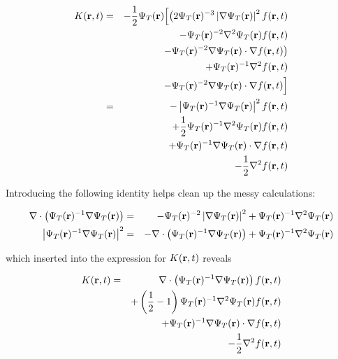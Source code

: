 \begin{eqnarray*}
K(\mathbf{r}, t) &=& -\frac{1}{2}\Psi_T(\mathbf{r})\Big[\big(2\Psi_T(\mathbf{r})^{-3}\left|\nabla\Psi_T(\mathbf{r})\right|^2f(\mathbf{r}, t) \\
        & & - \Psi_T(\mathbf{r})^{-2}\nabla^2\Psi_T(\mathbf{r})f(\mathbf{r}, t) \\
        & & - \Psi_T(\mathbf{r})^{-2}\nabla\Psi_T(\mathbf{r})\cdot\nabla f(\mathbf{r}, t)\big) \\
        & & + \Psi_T(\mathbf{r})^{-1}\nabla^2 f(\mathbf{r}, t) \\
        & & - \Psi_T(\mathbf{r})^{-2}\nabla\Psi_T(\mathbf{r})\cdot\nabla f(\mathbf{r}, t)\Big] \\
        &=& - \left|\Psi_T(\mathbf{r})^{-1}\nabla\Psi_T(\mathbf{r})\right|^2f(\mathbf{r}, t) \\
        & & + \frac{1}{2}\Psi_T(\mathbf{r})^{-1}\nabla^2\Psi_T(\mathbf{r})f(\mathbf{r}, t) \\
        & & + \Psi_T(\mathbf{r})^{-1}\nabla\Psi_T(\mathbf{r})\cdot\nabla f(\mathbf{r}, t) \\
        & & - \frac{1}{2}\nabla^2 f(\mathbf{r}, t) \\
\end{eqnarray*}

Introducing the following identity helps clean up the messy calculations:

\begin{eqnarray*}
 \nabla\cdot\left(\Psi_T(\mathbf{r})^{-1}\nabla\Psi_T(\mathbf{r})\right) &=& -\Psi_T(\mathbf{r})^{-2}\left|\nabla\Psi_T(\mathbf{r})\right|^2 + \Psi_T(\mathbf{r})^{-1}\nabla^2\Psi_T(\mathbf{r}) \\
 \left|\Psi_T(\mathbf{r})^{-1}\nabla\Psi_T(\mathbf{r})\right|^2 &=& -\nabla\cdot\left(\Psi_T(\mathbf{r})^{-1}\nabla\Psi_T(\mathbf{r})\right) + \Psi_T(\mathbf{r})^{-1}\nabla^2\Psi_T(\mathbf{r})
\end{eqnarray*}

which inserted into the expression for $K(\mathbf{r}, t)$ reveals

\begin{eqnarray*}
K(\mathbf{r}, t) &=&  \nabla\cdot\left(\Psi_T(\mathbf{r})^{-1}\nabla\Psi_T(\mathbf{r})\right)f(\mathbf{r}, t) \\
        & & + \left(\frac{1}{2} - 1\right)\Psi_T(\mathbf{r})^{-1}\nabla^2\Psi_T(\mathbf{r})f(\mathbf{r}, t) \\
        & & + \Psi_T(\mathbf{r})^{-1}\nabla\Psi_T(\mathbf{r})\cdot\nabla f(\mathbf{r}, t) \\
        & & - \frac{1}{2}\nabla^2 f(\mathbf{r}, t) \\
\end{eqnarray*}

